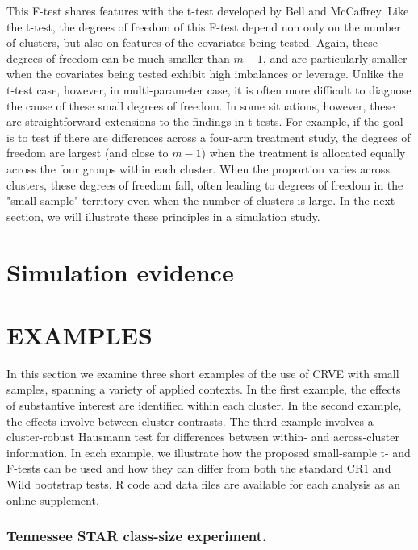 \documentclass[12pt]{article}
\begin{document}
This F-test shares features with the t-test developed by Bell and McCaffrey. Like the t-test, the degrees of freedom of this F-test depend non only on the number of clusters, but also on features of the covariates being tested. Again, these degrees of freedom can be much smaller than $m - 1$, and are particularly smaller when the covariates being tested exhibit high imbalances or leverage. Unlike the t-test case, however, in multi-parameter case, it is often more difficult to diagnose the cause of these small degrees of freedom. In some situations, however, these are straightforward extensions to the findings in t-tests. For example, if the goal is to test if there are differences across a four-arm treatment study, the degrees of freedom are largest (and close to $m - 1$) when the treatment is allocated equally across the four groups within each cluster. When the proportion varies across clusters, these degrees of freedom fall, often leading to degrees of freedom in the "small sample" territory even when the number of clusters is large. In the next section, we will illustrate these principles in a simulation study.



\section{Simulation evidence}
\label{subsec:simulations}

\section{EXAMPLES}
\label{subsec:examples_F}

In this section we examine three short examples of the use of CRVE with small samples, spanning a variety of applied contexts. In the first example, the effects of substantive interest are identified within each cluster. In the second example, the effects involve between-cluster contrasts. The third example involves a cluster-robust Hausmann test for differences between within- and across-cluster information. In each example, we illustrate how the proposed small-sample t- and F-tests can be used and how they can differ from both the standard CR1 and Wild bootstrap tests. R code and data files are available for each analysis as an online supplement.

\subsubsection{Tennessee STAR class-size experiment.} 
\end{document}
